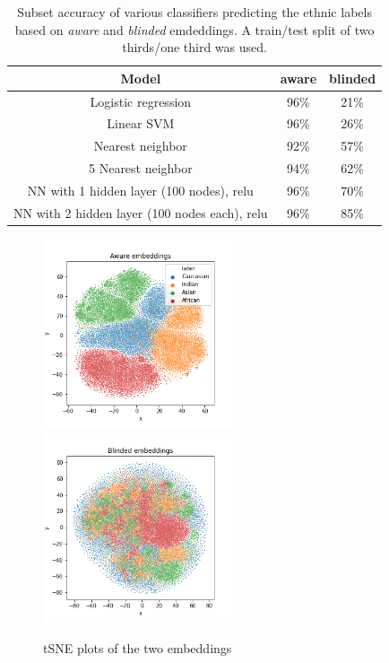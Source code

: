 \documentclass{report}
\begin{document}
\begin{table}
\begin{center}
\begin{tabular}{ c|c|c  }
Model & aware  & blinded  \\
\hline
Logistic regression & 96\% & 21\% \\ 
Linear SVM & 96\% & 26\% \\  
Nearest neighbor & 92\% &  57\%  \\   
5 Nearest neighbor & 94\% &  62\%  \\   
NN with 1 hidden layer (100 nodes), relu  & 96\% &  70\%  \\   
NN with 2 hidden layer (100 nodes each), relu  & 96\% &  85\%    
\end{tabular}
\end{center}
\caption{Subset accuracy of various classifiers predicting the ethnic labels based on \emph{aware}  and \emph{blinded} emdeddings. A train/test split of two thirds/one third was used.}
\label{tab:awareness}
\end{table}

\begin{figure}
  \includegraphics[width=0.5\textwidth]{t-SNE_aware.png}
  \includegraphics[width=0.5\textwidth]{t-SNE_blinded.png}
  \caption{tSNE plots of the two embeddings}
  \label{fig:tSNE}
\end{figure}
\end{document}
